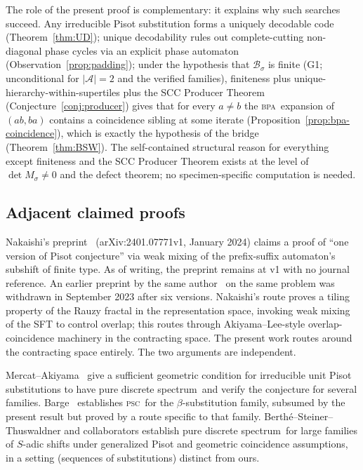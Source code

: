 \documentclass[11pt]{article}
\theoremstyle{plain}
\theoremstyle{definition}
\theoremstyle{remark}
\newcommand{\PSC}{\textsc{psc}}
\newcommand{\BPA}{\textsc{bpa}}
\newcommand{\PDS}{pure discrete spectrum}
\newcommand{\A}{\mathcal{A}}
\newcommand{\B}{\mathcal{B}}
\begin{document}
The role of the present proof is complementary: it explains why such searches succeed. Any irreducible Pisot substitution forms a uniquely decodable code (Theorem~\ref{thm:UD}); unique decodability rules out complete-cutting non-diagonal phase cycles via an explicit phase automaton (Observation~\ref{prop:padding}); under the hypothesis that $\B_\sigma$ is finite (G1; unconditional for $|\A|=2$ and the verified families), finiteness plus unique-hierarchy-within-supertiles plus the SCC Producer Theorem (Conjecture~\ref{conj:producer}) gives that for every $a\ne b$ the \BPA\ expansion of $(ab,ba)$ contains a coincidence sibling at some iterate (Proposition~\ref{prop:bpa-coincidence}), which is exactly the hypothesis of the bridge (Theorem~\ref{thm:BSW}). The self-contained structural reason for everything except finiteness and the SCC Producer Theorem exists at the level of $\det M_\sigma\ne 0$ and the defect theorem; no specimen-specific computation is needed.

\subsection{Adjacent claimed proofs}\label{sec:adjacent}

Nakaishi's preprint~\cite{Nakaishi2024} (arXiv:2401.07771v1, January 2024) claims a proof of ``one version of Pisot conjecture'' via weak mixing of the prefix-suffix automaton's subshift of finite type. As of writing, the preprint remains at v1 with no journal reference. An earlier preprint by the same author~\cite{Nakaishi2016} on the same problem was withdrawn in September 2023 after six versions. Nakaishi's route proves a tiling property of the Rauzy fractal in the representation space, invoking weak mixing of the SFT to control overlap; this routes through Akiyama--Lee-style overlap-coincidence machinery in the contracting space. The present work routes around the contracting space entirely. The two arguments are independent.

Mercat--Akiyama~\cite{MA} give a sufficient geometric condition for irreducible unit Pisot substitutions to have \PDS\ and verify the conjecture for several families. Barge~\cite{Barge2018} establishes \PSC\ for the $\beta$-substitution family, subsumed by the present result but proved by a route specific to that family. Berth\'e--Steiner--Thuswaldner and collaborators establish \PDS\ for large families of $S$-adic shifts under generalized Pisot and geometric coincidence assumptions, in a setting (sequences of substitutions) distinct from ours.
\end{document}
